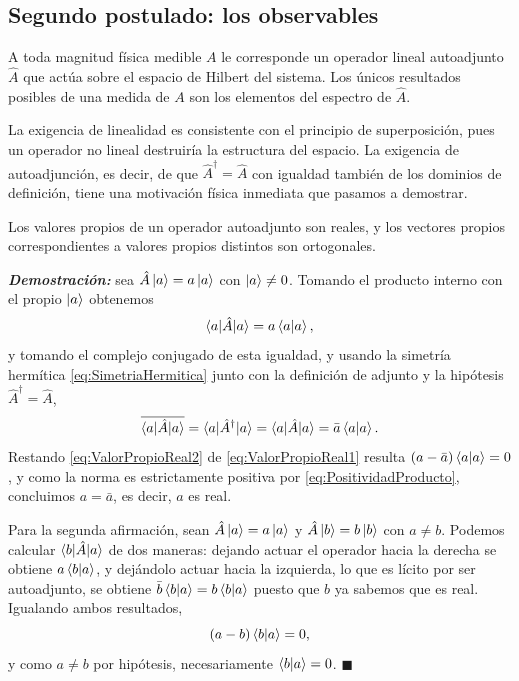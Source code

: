     \subsection{Segundo postulado: los observables}

        \begin{Assumption}[Observables]\label{sup:Observables}
            A toda magnitud física medible $A$ le corresponde un operador lineal autoadjunto $\hat{A}$ que actúa sobre el espacio de Hilbert del sistema. Los únicos resultados posibles de una medida de $A$ son los elementos del espectro de $\hat{A}$.
        \end{Assumption}

        La exigencia de linealidad es consistente con el principio de superposición, pues un operador no lineal destruiría la estructura del espacio. La exigencia de autoadjunción, es decir, de que $\hat{A}^{\dagger} = \hat{A}$ con igualdad también de los dominios de definición, tiene una motivación física inmediata que pasamos a demostrar.

        \begin{myteo}\label{teo:ValoresPropiosReales}
            Los valores propios de un operador autoadjunto son reales, y los vectores propios correspondientes a valores propios distintos son ortogonales.
        \end{myteo}

        \textbf{\textit{Demostración:}} sea $\hat{A}\ket{a} = a\ket{a}$ con $\ket{a}\neq 0$. Tomando el producto interno con el propio $\ket{a}$ obtenemos
        \begin{equation}\label{eq:ValorPropioReal1}
            \braket{a|\hat{A}|a} = a\braket{a|a},
        \end{equation}
        y tomando el complejo conjugado de esta igualdad, y usando la simetría hermítica \eqref{eq:SimetriaHermitica} junto con la definición de adjunto y la hipótesis $\hat{A}^{\dagger} = \hat{A}$,
        \begin{equation}\label{eq:ValorPropioReal2}
            \overline{\braket{a|\hat{A}|a}} = \braket{a|\hat{A}^{\dagger}|a} = \braket{a|\hat{A}|a} = \bar{a}\braket{a|a} .
        \end{equation}
        Restando \eqref{eq:ValorPropioReal2} de \eqref{eq:ValorPropioReal1} resulta $\left(a - \bar{a}\right)\braket{a|a} = 0$, y como la norma es estrictamente positiva por \eqref{eq:PositividadProducto}, concluimos $a = \bar{a}$, es decir, $a$ es real.

        Para la segunda afirmación, sean $\hat{A}\ket{a} = a\ket{a}$ y $\hat{A}\ket{b} = b\ket{b}$ con $a\neq b$. Podemos calcular $\braket{b|\hat{A}|a}$ de dos maneras: dejando actuar el operador hacia la derecha se obtiene $a\braket{b|a}$, y dejándolo actuar hacia la izquierda, lo que es lícito por ser autoadjunto, se obtiene $\bar{b}\braket{b|a} = b\braket{b|a}$ puesto que $b$ ya sabemos que es real. Igualando ambos resultados,
        \begin{equation}\label{eq:Ortogonalidad}
            \left(a - b\right)\braket{b|a} = 0,
        \end{equation}
        y como $a\neq b$ por hipótesis, necesariamente $\braket{b|a} = 0$. $\blacksquare$

